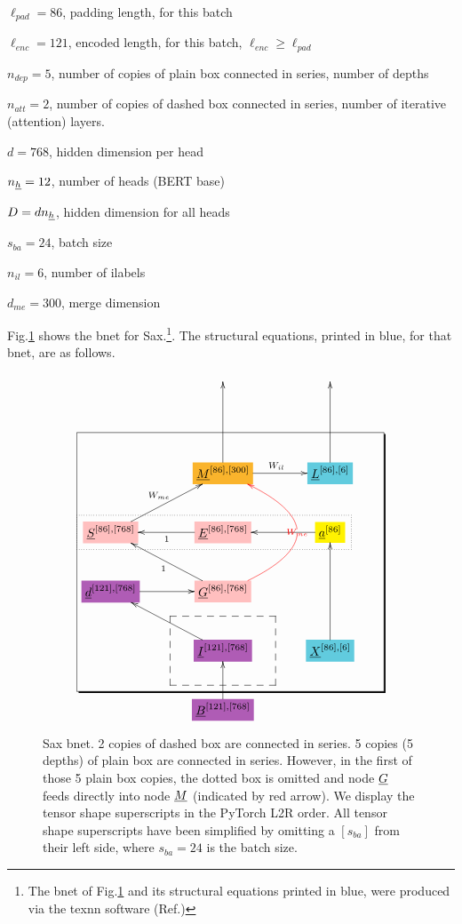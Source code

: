 $\ell_{pad}=86$, padding length, for this batch

$\ell_{enc}=121$, encoded length, for this batch, $\ell_{enc}\geq \ell_{pad}$

$n_{dep}=5$, number of copies of plain box connected in series, number of depths

 $n_{att}=2$, number of copies of
dashed box connected in series, number of iterative (attention) layers.


$d=768$, hidden dimension per head

$n_\rvh=12$, number of heads (BERT base)

$D=d n_\rvh$, hidden dimension
for all heads


$s_{ba}=24$, batch size

$n_{il}=6$, number of ilabels

$d_{me}=300$, merge dimension

Fig.\ref{fig-texnn-for-sentence-ax-bnet}
shows the bnet  for Sax.\footnote{The
bnet of Fig.\ref{fig-texnn-for-sentence-ax-bnet}
and its structural equations
printed in blue,
were produced via the texnn software (Ref.\cite{texnn})}. The structural equations, printed in 
blue, for that bnet, are as follows.

\begin{figure}[h!]\centering
$$\xymatrix@R=2.5pc@C=3.5pc{
&&
\\
&&
\\
&*+[F*:Dandelion]{\underline{M}^{[86], [300]}}\ar[uu]\ar[r]^{W_{il}}&*+[F*:SkyBlue]{\underline{L}^{[86], [6]}}\ar[uu]
\\
*+[F*:pink]{\underline{S}^{[86], [768]}}\ar[ur]^{W_{me}}&*+[F*:pink]{\underline{E}^{[86], [768]}}\ar[l]^{1}&*+[F*:yellow]{\underline{a}^{[86]}}\ar[l]
\\
*+[F*:Orchid]{\underline{d}^{[121], [768]}}\ar[r]&*+[F*:pink]{\underline{G}^{[86], [768]}}\ar@[red]@/_5pc/[uu]|-{\color{red} W_{me}}\ar[ul]^{1}&
\\
&*+[F*:Orchid]{\underline{I}^{[121], [768]}}\ar[ul]&*+[F*:SkyBlue]{\underline{X}^{[86], [6]}}\ar[uu]
\\
&*+[F*:Orchid]{\underline{B}^{[121], [768]}}\ar[u]&
\save
\POS"3,1"."6,1"."3,3"."6,3"!C*+<4.8em>\frm{-,}
\POS"6,2"."6,2"."6,2"."6,2"!C*+<3.8em>\frm{--}
\POS"4,1"."4,1"."4,3"."4,3"!C*+<1.0em>\frm{.}
\restore
}$$
\caption{Sax bnet. 2 copies of dashed box are connected in series. 5 copies (5 depths) of plain box are connected in series.  However, in the first of those 5 plain box copies, the dotted box  is omitted and node $\ul{G}$ feeds directly into node  $\ul{M}$ (indicated by red arrow). We display the tensor shape superscripts in the PyTorch L2R order. All tensor shape superscripts have been simplified by omitting a $[s_{ba}]$ from their left side, where $s_{ba}=24$ is the batch size. }
\label{fig-texnn-for-sentence-ax-bnet}
\end{figure}

